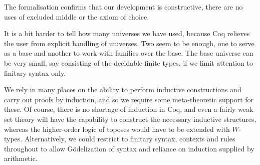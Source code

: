 The formalisation confirms that our development is constructive, there are no uses of excluded middle or the axiom of choice.

It is a bit harder to tell how many universes we have used, because Coq relieves the user from explicit handling of universes. Two seem to be enough, one to serve as a base and another to work with families over the base. The base universe can be very small, say consisting of the decidable finite types, if we limit attention to finitary syntax only.

We rely in many places on the ability to perform inductive constructions and carry out proofs by induction, and so we require some meta-theoretic support for these. Of course, there is no shortage of induction in Coq, and even a fairly weak set theory will have the capability to construct the necessary inductive structures, whereas the higher-order logic of toposes would have to be extended with $W$-types. Alternatively, we could restrict to finitary syntax, contexts and rules throughout to allow Gödelization of 
syntax and reliance on induction supplied by arithmetic.

